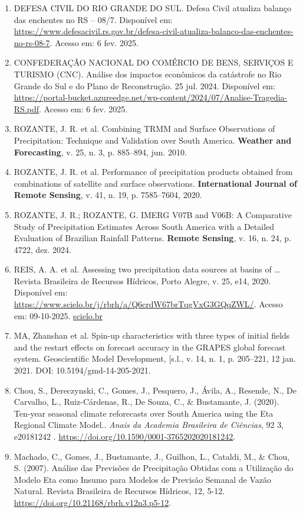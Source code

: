 \documentclass[12pt,a4paper,oneside]{book}
\begin{document}
\begin{enumerate}
\item
  DEFESA CIVIL DO RIO GRANDE DO SUL. Defesa Civil atualiza balanço das enchentes no RS -- 08/7. Disponível em: \url{https://www.defesacivil.rs.gov.br/defesa-civil-atualiza-balanco-das-enchentes-no-rs-08-7}. Acesso em: 6 fev. 2025.
\item
  CONFEDERAÇÃO NACIONAL DO COMÉRCIO DE BENS, SERVIÇOS E TURISMO (CNC). Análise dos impactos econômicos da catástrofe no Rio Grande do Sul e do Plano de Reconstrução. 25 jul. 2024. Disponível em: \url{https://portal-bucket.azureedge.net/wp-content/2024/07/Analise-Tragedia-RS.pdf}. Acesso em: 6 fev. 2025.
\item
  ROZANTE, J. R. et al. Combining TRMM and Surface Observations of Precipitation: Technique and Validation over South America. \textbf{Weather and Forecasting}, v. 25, n. 3, p. 885--894, jun. 2010.
\item
  ROZANTE, J. R. et al. Performance of precipitation products obtained from combinations of satellite and surface observations. \textbf{International Journal of Remote Sensing}, v. 41, n. 19, p. 7585--7604, 2020.
\item
  ROZANTE, J. R.; ROZANTE, G. IMERG V07B and V06B: A Comparative Study of Precipitation Estimates Across South America with a Detailed Evaluation of Brazilian Rainfall Patterns. \textbf{Remote Sensing}, v. 16, n. 24, p. 4722, dez. 2024.
\item
  REIS, A. A. et al. Assessing two precipitation data sources at basins of \ldots{} Revista Brasileira de Recursos Hídricos, Porto Alegre, v. 25, e14, 2020. Disponível em: \url{https://www.scielo.br/j/rbrh/a/Q6crdW67brTqgVxG3GQqZWL/}. Acesso em: 09-10-2025. \href{https://www.scielo.br/j/rbrh/a/Q6crdW67brTqgVxG3GQqZWL/?format=pdf}{scielo.br}
\item
  MA, Zhanshan et al. Spin-up characteristics with three types of initial fields and the restart effects on forecast accuracy in the GRAPES global forecast system. Geoscientific Model Development, {[}s.l., v. 14, n. 1, p. 205--221, 12 jan. 2021. DOI: 10.5194/gmd-14-205-2021.
\item
  Chou, S., Dereczynski, C., Gomes, J., Pesquero, J., Ávila, A., Resende, N., De Carvalho, L., Ruiz-Cárdenas, R., De Souza, C., \& Bustamante, J. (2020). Ten-year seasonal climate reforecasts over South America using the Eta Regional Climate Model.. \emph{Anais da Academia Brasileira de Ciências}, 92 3, e20181242 . \url{https://doi.org/10.1590/0001-3765202020181242}.
\item
  Machado, C., Gomes, J., Bustamante, J., Guilhon, L., Cataldi, M., \& Chou, S. (2007). Análise das Previsões de Precipitação Obtidas com a Utilização do Modelo Eta como Insumo para Modelos de Previsão Semanal de Vazão Natural. Revista Brasileira de Recursos Hídricos, 12, 5-12. \url{https://doi.org/10.21168/rbrh.v12n3.p5-12}.

\end{enumerate}
\end{document}
